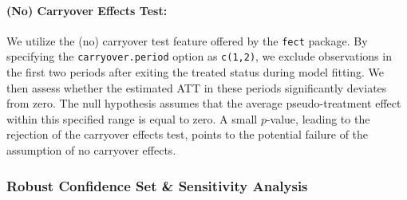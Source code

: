 \documentclass[12pt]{article}
\begin{document}
\paragraph*{(No) Carryover Effects Test:} We utilize the (no) carryover test feature offered by the \texttt{fect} package. By specifying the \texttt{carryover.period} option as \texttt{c(1,2)}, we exclude observations in the first two periods after exiting the treated status during model fitting. We then assess whether the estimated ATT in these periods significantly deviates from zero. The null hypothesis assumes that the average pseudo-treatment effect within this specified range is equal to zero. A small $p$-value, leading to the rejection of the carryover effects test, points to the potential failure of the assumption of no carryover effects.


\subsubsection{Robust Confidence Set \& Sensitivity Analysis}
\end{document}
